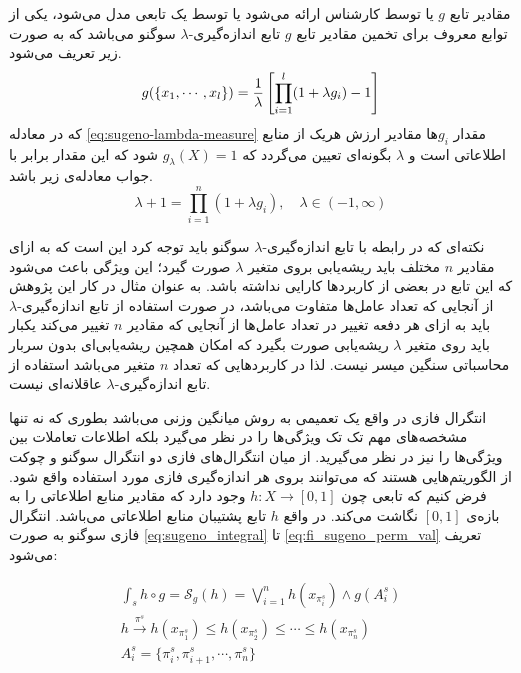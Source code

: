 مقادیر تابع $g$ یا توسط کارشناس ارائه می‌شود یا توسط یک تابعی مدل می‌شود، یکی از توابع معروف برای تخمین مقادیر تابع $g$ تابع اندازه‌گیری-$\lambda$ سوگنو می‌باشد که به صورت زیر تعریف می‌شود.
\begin{equation}\label{eq:sugeno-lambda-measure}
g(\{x_1,\cdots,x_l\}) = {1 \over \lambda}\left[\prod_{i=1}^l(1 + \lambda g_i) - 1\right]
\end{equation}
که در معادله \ref{eq:sugeno-lambda-measure} مقدار $g_i$ها مقادیر ارزش هریک از منابع اطلاعاتی است و $\lambda$ بگونه‌ای تعیین می‌گردد که $g_\lambda(X) = 1$ شود که این مقدار برابر با جواب معادله‌ی زیر باشد.
\begin{equation}\label{eq:sugeno-lambda-measure:rooting}
\lambda + 1 = \prod_{i=1}^{n} (1 + \lambda g_i), \hspace{1em} \lambda \in (-1, \infty) 
\end{equation}

نکته‌ای که در رابطه با تابع اندازه‌گیری-$\lambda$ سوگنو باید توجه کرد این است که به ازای مقادیر $n$ مختلف باید ریشه‌یابی بروی متغیر $\lambda$ صورت گیرد؛ این ویژگی‌ باعث می‌شود که این تابع در بعضی از کاربردها کارایی نداشته باشد. به عنوان مثال در کار این پژوهش از آنجایی که تعداد عامل‌ها متفاوت می‌باشد، در صورت استفاده از تابع اندازه‌گیری-$\lambda$ باید به ازای هر دفعه تغییر در تعداد عامل‌ها از آنجایی که مقادیر $n$ تغییر می‌کند یکبار باید روی متغیر $\lambda$ ریشه‌یابی صورت بگیرد که امکان همچین ریشه‌یابی‌‌ای بدون سربار محاسباتی سنگین میسر نیست. لذا در کاربردهایی که تعداد $n$ متغیر می‌باشد استفاده از تابع اندازه‌گیری-$\lambda$ عاقلانه‌ای نیست.

انتگرال فازی در واقع یک تعمیمی به روش میانگین وزنی می‌باشد بطوری که نه تنها مشخصه‌های مهم تک تک ویژگی‌ها را در نظر می‌گیرد بلکه اطلاعات تعاملات بین ویژگی‌ها را نیز در نظر می‌گیرید. از میان انتگرال‌های فازی دو انتگرال سوگنو و چوکت از الگوریتم‌هایی هستند که می‌توانند بروی هر اندازه‌گیری‌ فازی مورد استفاده واقع شود. فرض کنیم که تابعی چون
$h : X \rightarrow [0, 1]$
وجود دارد که مقادیر منابع اطلاعاتی را به بازه‌ی $[0,1]$ نگاشت می‌کند. در واقع $h$ تابع پشتیبان منابع اطلاعاتی می‌باشد. انتگرال فازی سوگنو به صورت
\ref{eq:sugeno_integral} تا \ref{eq:fi_sugeno_perm_val}
تعریف می‌شود:

\begin{eqnarray}
\int_{s} h \circ g = \mathcal{S}_g(h) = \bigvee_{i=1}^{n} h(x_{\pi_i^s}) \wedge g(A_i^s)\label{eq:sugeno_integral}\\
h \xrightarrow{\pi^s} h(x_{\pi_1^s}) \leq h(x_{\pi_2^s}) \leq \cdots \leq h(x_{\pi_n^s})\label{eq:fi_sugeno_perm_op}\\
A_i^s = \{\pi_i^s, \pi_{i+1}^s, \cdots, \pi_n^s\}\label{eq:fi_sugeno_perm_val}
\end{eqnarray}

